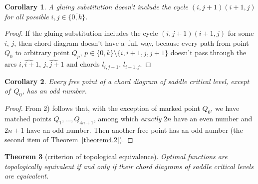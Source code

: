 \documentclass[pdftex]{sigma}
\numberwithin{equation}{section}
\newtheorem{Theorem}{Theorem}[section]
\newtheorem{Corollary}[Theorem]{Corollary}
\begin{document}
\begin{Corollary}\label{corollary4.1}
A gluing substitution doesn't include the cycle $(i,j+1)(i+1,j)$ for all possible $i,j\in\{\overline{0,k}\}$.
\end{Corollary}

\begin{proof}
If the gluing substitution includes the cycle $(i,j+1)(i+1,j)$ for some $i$, $j$, then chord diagram doesn't have a~full way, because every path from point $Q_0$ to arbitrary point $Q_p$, $p\in\{0,k\}{\setminus}\{i,i+1,j,j+1\}$ doesn't pass through the arcs $\widehat{i,i+1}$, $\widehat{j,j+1}$ and chords $l_{i,j+1}$, $l_{i+1,j}$.
\end{proof}

\begin{Corollary}\label{corollary4.2}
Every free point of a chord diagram of saddle critical level, except of~$Q_{0}$, has an odd number.
\end{Corollary}

\begin{proof}
From 2) follows that, with the exception of marked point $Q_{0}$, we have matched points $Q_{1},\ldots,Q_{4n+1}$, among which {\it exactly} $2n$ have an even number and $2n+1$ have an odd number. Then another free point has an odd number (the second item of Theorem~\ref{theorem4.2}).
\end{proof}

\begin{Theorem}[criterion of topological equivalence] \label{theorem4.3}
Optimal functions are topologically equi\-va\-lent if and only if their chord diagrams of saddle critical levels are equivalent.
\end{Theorem}
\end{document}
